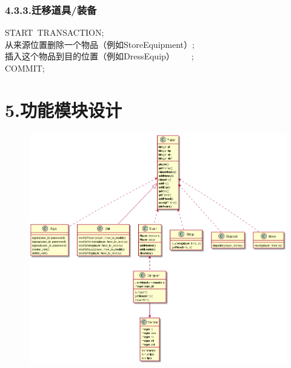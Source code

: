 \documentclass{article}
\begin{document}
\subsubsection{4.3.3.\hspace*{0.5em}迁移道具/装备}\label{433}%
\begin{mdpre}%
\noindent START~TRANSACTION;\\
从来源位置删除一个物品（例如StoreEquipment）;\\
插入这个物品到目的位置（例如DressEquip）~~~~;\\
COMMIT;%
\end{mdpre}
\section{5.\hspace*{0.5em}功能模块设计}\label{5}%

\begin{figure}[tbp]%
\begin{mdcenter}%

\noindent{}\includegraphics[keepaspectratio=true,width=\dimwidth{1.00}]{./img/10}{}%

\mdhr{}%

\noindent{}%
\end{mdcenter}%
\end{figure}%
\end{document}
